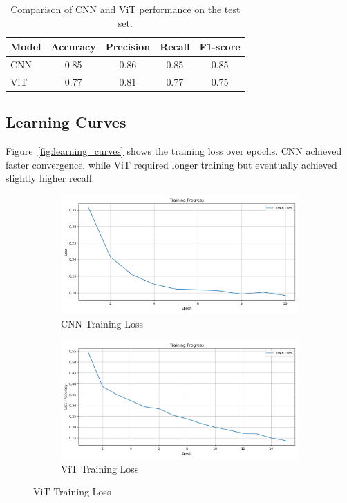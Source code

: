 \documentclass{article}
\begin{document}
\begin{table}[h!]
\centering
\begin{tabular}{lcccc}
\toprule
Model & Accuracy & Precision & Recall & F1-score \\
\midrule
CNN   & 0.85    & 0.86      & 0.85   & 0.85 \\
ViT   & 0.77    & 0.81      & 0.77   & 0.75 \\
\bottomrule
\end{tabular}
\caption{Comparison of CNN and ViT performance on the test set.}
\label{tab:results}
\end{table}

\subsection{Learning Curves}
Figure~\ref{fig:learning_curves} shows the training loss over epochs. CNN achieved faster convergence, while ViT required longer training but eventually achieved slightly higher recall.

\begin{figure}[h!]
    \centering
    \begin{subfigure}[b]{0.45\textwidth}
        \includegraphics[width=\textwidth]{cnn_training_loss.png}
        \caption{CNN Training Loss}
        \label{fig:cnn_training_losses}
    \end{subfigure}
    \hfill
    \begin{subfigure}[b]{0.45\textwidth}
        \includegraphics[width=\textwidth]{vit_training_loss.png}
        \caption{ViT Training Loss}
        \label{fig:vit_training_losses}
    \end{subfigure}
\end{figure}
\end{document}

